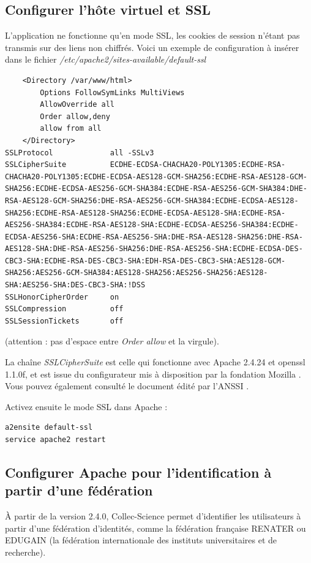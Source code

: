 \subsection{Configurer l'hôte virtuel et SSL}
L'application ne fonctionne qu'en mode SSL, les cookies de session n'étant pas transmis sur des liens non chiffrés. Voici un exemple de configuration à insérer dans le fichier \textit{/etc/apache2/sites-available/default-ssl}
\begin{lstlisting}
    <Directory /var/www/html>
        Options FollowSymLinks MultiViews
        AllowOverride all
        Order allow,deny
        allow from all
    </Directory>
SSLProtocol             all -SSLv3
SSLCipherSuite          ECDHE-ECDSA-CHACHA20-POLY1305:ECDHE-RSA-CHACHA20-POLY1305:ECDHE-ECDSA-AES128-GCM-SHA256:ECDHE-RSA-AES128-GCM-SHA256:ECDHE-ECDSA-AES256-GCM-SHA384:ECDHE-RSA-AES256-GCM-SHA384:DHE-RSA-AES128-GCM-SHA256:DHE-RSA-AES256-GCM-SHA384:ECDHE-ECDSA-AES128-SHA256:ECDHE-RSA-AES128-SHA256:ECDHE-ECDSA-AES128-SHA:ECDHE-RSA-AES256-SHA384:ECDHE-RSA-AES128-SHA:ECDHE-ECDSA-AES256-SHA384:ECDHE-ECDSA-AES256-SHA:ECDHE-RSA-AES256-SHA:DHE-RSA-AES128-SHA256:DHE-RSA-AES128-SHA:DHE-RSA-AES256-SHA256:DHE-RSA-AES256-SHA:ECDHE-ECDSA-DES-CBC3-SHA:ECDHE-RSA-DES-CBC3-SHA:EDH-RSA-DES-CBC3-SHA:AES128-GCM-SHA256:AES256-GCM-SHA384:AES128-SHA256:AES256-SHA256:AES128-SHA:AES256-SHA:DES-CBC3-SHA:!DSS
SSLHonorCipherOrder     on
SSLCompression          off
SSLSessionTickets       off

\end{lstlisting}

(attention : pas d'espace entre \textit{Order allow} et la virgule).

La chaîne \textit{SSLCipherSuite} est celle qui fonctionne avec Apache 2.4.24 et openssl 1.1.0f, et est issue du configurateur mis à disposition par la fondation Mozilla \cite{mozillagenerator}. 
Vous pouvez également consulté le document édité par l'ANSSI \cite{tls}. 

Activez ensuite le mode SSL dans Apache :
\begin{lstlisting}
a2ensite default-ssl
service apache2 restart
\end{lstlisting}

\subsection{Configurer Apache pour l'identification à partir d'une fédération}
\label{mellon}
À partir de la version 2.4.0, Collec-Science permet d'identifier les utilisateurs à partir d'une fédération d'identités, comme la fédération française RENATER ou EDUGAIN (la fédération internationale des instituts universitaires et de recherche).

